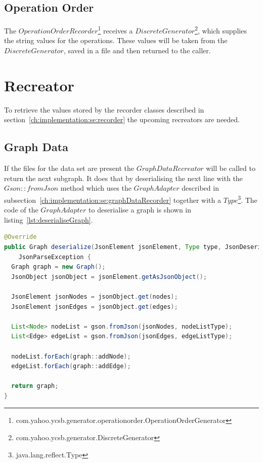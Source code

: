 \subsection{Operation Order}
\label{ch:implementation:se:operationOrderRecorder}
The $ OperationOrderRecorder $\footnote{com.yahoo.ycsb.generator.operationorder.OperationOrderGenerator} receives a $ DiscreteGenerator $\footnote{com.yahoo.ycsb.generator.DiscreteGenerator},
which supplies the string values for the operations.
These values will be taken from the $ DiscreteGenerator $,
saved in a file and then returned to the caller.

\section{Recreator}
\label{ch:implementation:se:recreator}
To retrieve the values stored by the recorder classes described in section~\ref{ch:implementation:se:recorder} the upcoming recreators are needed.

\subsection{Graph Data}
If the files for the data set are present the $ GraphDataRecreator $ will be called to return the next subgraph.
It does that by deserialising the next line with the $ Gson::fromJson $ method which uses the $ GraphAdapter $ described in subsection~\ref{ch:implementation:se:graphDataRecorder} together with a $ Type $\footnote{java.lang.reflect.Type}.
The code of the $ GraphAdapter $ to deserialise a graph is shown in listing~\ref{lst:deserialiseGraph}.

\begin{lstlisting}[language=Java,label={lst:deserialiseGraph},caption={Deserialisation of a graph object.}]
@Override
public Graph deserialize(JsonElement jsonElement, Type type, JsonDeserializationContext context) throws
    JsonParseException {
  Graph graph = new Graph();
  JsonObject jsonObject = jsonElement.getAsJsonObject();

  JsonElement jsonNodes = jsonObject.get(nodes);
  JsonElement jsonEdges = jsonObject.get(edges);

  List<Node> nodeList = gson.fromJson(jsonNodes, nodeListType);
  List<Edge> edgeList = gson.fromJson(jsonEdges, edgeListType);

  nodeList.forEach(graph::addNode);
  edgeList.forEach(graph::addEdge);

  return graph;
}
\end{lstlisting}

